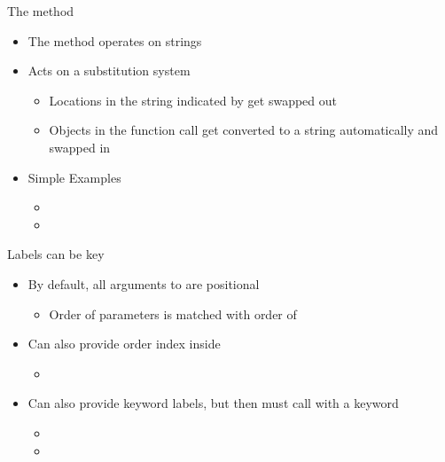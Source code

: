 \documentclass[pdf, aspectratio=169, 12pt]{beamer}
\begin{document}
\begin{frame}{The  method}
	\begin{itemize}
		\item The  method operates on \alert{strings}
		\item Acts on a substitution system
			\begin{itemize}
				\item Locations in the string indicated by \pyi{\{ \}} get swapped out
				\item Objects in the function call get converted to a string automatically and swapped in
			\end{itemize}
		\item Simple Examples
			\begin{itemize}
				\item {}
				\item {}
			\end{itemize}
	\end{itemize}
\end{frame}

\begin{frame}{Labels can be key}
	\begin{itemize}
		\item By default, all arguments to  are positional
			\begin{itemize}
				\item Order of parameters is matched with order of \pyi{\{\}}
			\end{itemize}
		\item Can also provide order index inside \pyi{\{ \}}
			\begin{itemize}
				\item {}
			\end{itemize}
			
		\item Can also provide keyword labels, but then must call with a keyword
			\begin{itemize}
				\item {}
				\item {}
			\end{itemize}
	\end{itemize}
\end{frame}
\end{document}
